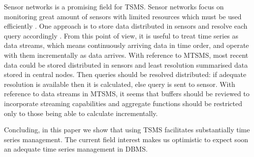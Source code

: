 Sensor networks is a promising field for TSMS. Sensor networks focus
on monitoring great amount of sensors with limited resources which
must be used efficiently \cite{yaogehrke02}. One approach is to store
data distributed in sensors and resolve each query accordingly
\cite{bonnet01}. From this point of view, it is useful to treat time
series as data streams, which means continuously arriving data in time
order, and operate with them incrementally as data arrives.  With
reference to MTSMS, most recent data could be stored distributed in
sensors and least resolution summarised data stored in central
nodes. Then queries should be resolved distributed: if adequate
resolution is available then it is calculated, else query is sent to
sensor.  With reference to data streams in MTSMS, it seems that
buffers should be reviewed to incorporate streaming capabilities and
aggregate functions should be restricted only to those being able
to calculate incrementally.


Concluding, in this paper we show that using TSMS facilitates
substantially time series management. The current field interest makes
us optimistic to expect soon an adequate time series management in
DBMS.











